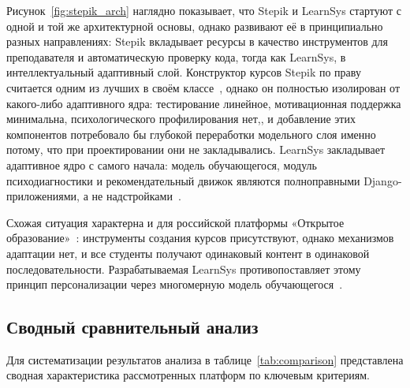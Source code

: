 Рисунок~\ref{fig:stepik_arch} наглядно показывает, что Stepik
и LearnSys стартуют с одной и той же архитектурной основы,
однако развивают её в принципиально разных направлениях:
Stepik вкладывает ресурсы в качество инструментов для
преподавателя и автоматическую проверку кода, тогда как
LearnSys, в интеллектуальный адаптивный слой. Конструктор
курсов Stepik по праву считается одним из лучших в своём
классе~\cite{stepik2026official}, однако он полностью изолирован
от какого-либо адаптивного ядра: тестирование линейное,
мотивационная поддержка минимальна, психологического
профилирования нет,, и добавление этих компонентов
потребовало бы глубокой переработки модельного слоя именно
потому, что при проектировании они не закладывались.
LearnSys закладывает адаптивное ядро с самого начала: модель
обучающегося, модуль психодиагностики и рекомендательный
движок являются полноправными Django-приложениями, а не
надстройками~\cite{brusilovsky2007usermodels}.

Схожая ситуация характерна и для российской платформы
«Открытое образование»~\cite{openedu2026official}: инструменты
создания курсов присутствуют, однако механизмов адаптации нет,
и все студенты получают одинаковый контент в одинаковой
последовательности. Разрабатываемая LearnSys противопоставляет
этому принцип персонализации через многомерную модель
обучающегося~\cite{conceptual_etraining}.

\subsection{Сводный сравнительный анализ}

Для систематизации результатов анализа в
таблице~\ref{tab:comparison} представлена сводная
характеристика рассмотренных платформ по ключевым критериям.

